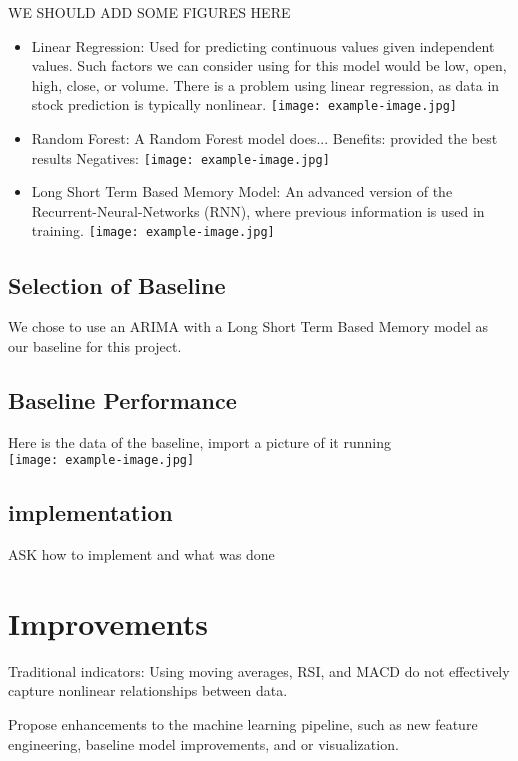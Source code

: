 \documentclass[conference]{IEEEtran}
\begin{document}
WE SHOULD ADD SOME FIGURES HERE

\begin{itemize}
\item{Linear Regression: }
Used for predicting continuous values given independent values.  Such factors we can consider using for this model would be low, open, high, close, or volume.  There is a problem using linear regression, as data in stock prediction is typically nonlinear.
\texttt{[image: example-image.jpg]} %

\item{Random Forest: }
A Random Forest model does...  Benefits:  provided the best results Negatives:
\texttt{[image: example-image.jpg]} %

\item{Long Short Term Based Memory Model: }
An advanced version of the Recurrent-Neural-Networks (RNN), where previous information is used in training.  
\texttt{[image: example-image.jpg]} %

\end{itemize}

\subsection{Selection of Baseline}
We chose to use an ARIMA with a Long Short Term Based Memory model as our baseline for this project.

\subsection{Baseline Performance}
Here is the data of the baseline, import a picture of it running
\\
\texttt{[image: example-image.jpg]}

\subsection{implementation}
ASK how to implement and what was done

\section{Improvements}
Traditional indicators: Using moving averages, RSI, and MACD do not effectively capture nonlinear relationships between data.

Propose enhancements to the machine learning pipeline, such as new feature engineering, baseline model improvements, and or visualization.
\end{document}
